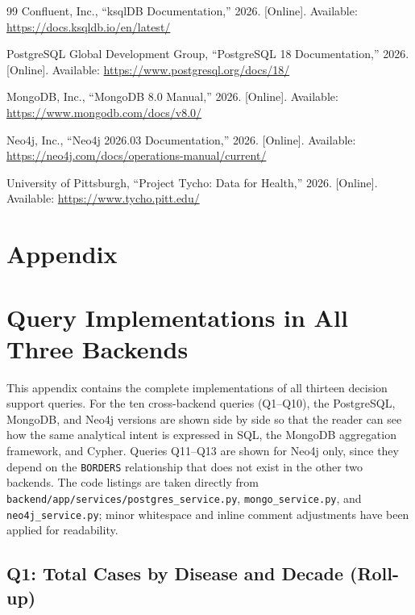 \documentclass[12pt,a4paper]{article}
\begin{document}
\begin{thebibliography}{99}
Confluent, Inc., ``ksqlDB Documentation,'' 2026. [Online]. Available: \url{https://docs.ksqldb.io/en/latest/}

PostgreSQL Global Development Group, ``PostgreSQL 18 Documentation,'' 2026. [Online]. Available: \url{https://www.postgresql.org/docs/18/}

MongoDB, Inc., ``MongoDB 8.0 Manual,'' 2026. [Online]. Available: \url{https://www.mongodb.com/docs/v8.0/}

Neo4j, Inc., ``Neo4j 2026.03 Documentation,'' 2026. [Online]. Available: \url{https://neo4j.com/docs/operations-manual/current/}

University of Pittsburgh, ``Project Tycho: Data for Health,'' 2026. [Online]. Available: \url{https://www.tycho.pitt.edu/}

\end{thebibliography}


\newpage
\section*{Appendix}
\appendix
\section{Query Implementations in All Three Backends}
\label{app:queries}

This appendix contains the complete implementations of all thirteen decision support queries. For the ten cross-backend queries (Q1--Q10), the PostgreSQL, MongoDB, and Neo4j versions are shown side by side so that the reader can see how the same analytical intent is expressed in SQL, the MongoDB aggregation framework, and Cypher. Queries Q11--Q13 are shown for Neo4j only, since they depend on the \texttt{BORDERS} relationship that does not exist in the other two backends. The code listings are taken directly from \texttt{backend/app/services/postgres\_service.py}, \texttt{mongo\_service.py}, and \texttt{neo4j\_service.py}; minor whitespace and inline comment adjustments have been applied for readability.

\lstset{basicstyle=\ttfamily\footnotesize}

\subsection*{Q1: Total Cases by Disease and Decade (Roll-up)}
\end{document}

